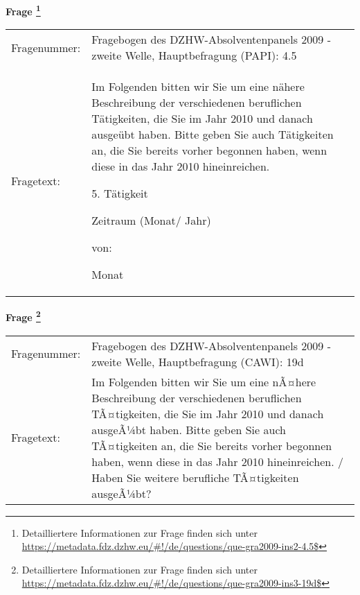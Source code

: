 				\vspace*{0.5cm}
                \noindent\textbf{Frage
	                \footnote{Detailliertere Informationen zur Frage finden sich unter
		              \url{https://metadata.fdz.dzhw.eu/\#!/de/questions/que-gra2009-ins2-4.5$}}}\\
				\begin{tabularx}{\hsize}{@{}lX}
					Fragenummer: &
					  Fragebogen des DZHW-Absolventenpanels 2009 - zweite Welle, Hauptbefragung (PAPI):
					  4.5
 \\
					Fragetext: & Im Folgenden bitten wir Sie um eine nähere Beschreibung der verschiedenen beruflichen Tätigkeiten, die Sie im Jahr 2010 und danach ausgeübt haben. Bitte geben Sie auch Tätigkeiten an, die Sie bereits vorher begonnen haben, wenn diese in das Jahr 2010 hineinreichen.\par  5. Tätigkeit\par  Zeitraum (Monat/ Jahr)\par  von:\par  Monat \\
				\end{tabularx}
				\vspace*{0.5cm}
                \noindent\textbf{Frage
	                \footnote{Detailliertere Informationen zur Frage finden sich unter
		              \url{https://metadata.fdz.dzhw.eu/\#!/de/questions/que-gra2009-ins3-19d$}}}\\
				\begin{tabularx}{\hsize}{@{}lX}
					Fragenummer: &
					  Fragebogen des DZHW-Absolventenpanels 2009 - zweite Welle, Hauptbefragung (CAWI):
					  19d
 \\
					Fragetext: & Im Folgenden bitten wir Sie um eine nÃ¤here Beschreibung der verschiedenen beruflichen TÃ¤tigkeiten, die Sie im Jahr 2010 und danach ausgeÃ¼bt haben. Bitte geben Sie auch TÃ¤tigkeiten an, die Sie bereits vorher begonnen haben, wenn diese in das Jahr 2010 hineinreichen. / Haben Sie weitere berufliche TÃ¤tigkeiten ausgeÃ¼bt? \\
				\end{tabularx}





